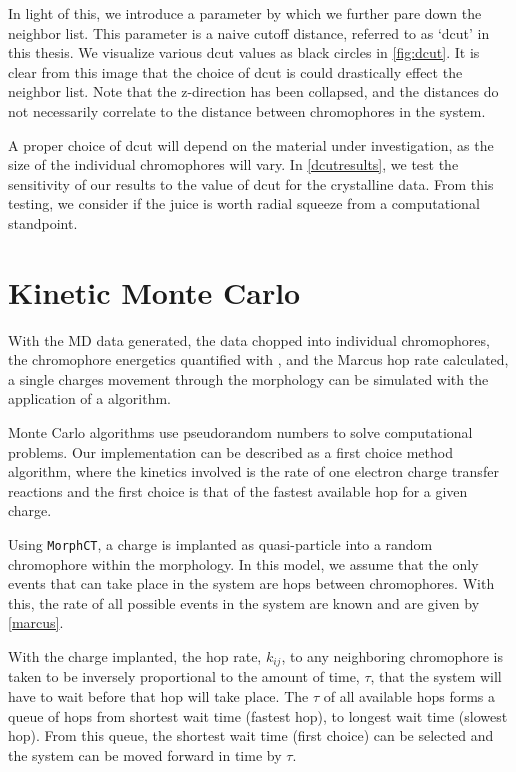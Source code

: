 In light of this, we introduce a parameter by which we further pare down the neighbor list. This parameter is
a naive cutoff distance, referred to as `dcut' in this thesis. We visualize various dcut values as black
circles in \autoref{fig:dcut}.
It is clear from this image that the choice of dcut is could drastically effect the
neighbor list.  
Note that the z-direction has been collapsed, and the distances do not necessarily correlate to the distance
between chromophores in the system.

A proper choice of dcut will depend on the material under investigation, 
as the size of the individual chromophores will vary. In 
\autoref{dcutresults}, we test the sensitivity of our results to the value of dcut for the crystalline 
data. From this testing, we consider if the juice is worth radial squeeze from a computational standpoint. 

\section{Kinetic Monte Carlo}
\label{KMC}

With the MD data generated, the data chopped into individual chromophores, 
the chromophore energetics
quantified with , and the Marcus hop rate calculated, 
a single charges movement through the morphology can be simulated with the
application of a  algorithm.

Monte Carlo algorithms use pseudorandom numbers to solve computational problems. Our implementation can be
described as a first choice method  algorithm, where the kinetics involved is the rate of one electron
charge transfer reactions and the first choice is that of the fastest available hop for a given charge.

Using \texttt{MorphCT}, a charge is implanted as quasi-particle into a random chromophore within 
the morphology. In this model, we assume that the only events that can take place in the system are hops
between chromophores. With this, the rate of all possible events in the system are known and are given by
\autoref{marcus}. 

With the charge implanted, the hop rate, $k_{ij}$, to any
neighboring chromophore is taken to be
inversely proportional to the amount of time, $\tau$, that the system will have to wait before that hop will
take place. The $\tau$ of all available hops forms a queue of hops from
shortest wait time (fastest hop), to
longest wait time (slowest hop). From this queue, the shortest wait time (first choice) can be selected
and the system can be moved forward in time by $\tau$.

